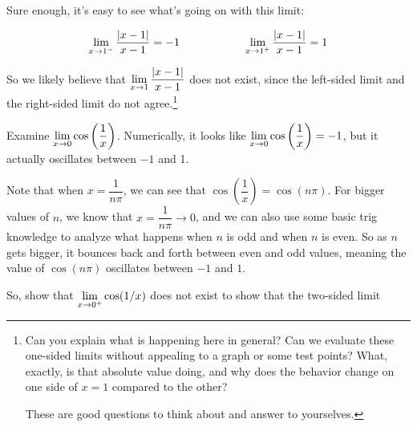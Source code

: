 \begin{enumerate}
  Sure enough, it's easy to see what's going on with this limit:

  $$\displaystyle \lim_{x\to1^-} \dfrac{|x-1|}{x-1} = -1 \hspace{2cm}\displaystyle \lim_{x\to1^+} \dfrac{|x-1|}{x-1} = 1$$

  So we likely believe that $\displaystyle \lim_{x\to1} \dfrac{|x-1|}{x-1}$ does not exist, since the left-sided limit and the right-sided limit do not agree.\footnote{Can you explain what is happening here in general?
  Can we evaluate these one-sided limits without appealing to a graph or some test points?
  What, exactly, is that absolute value doing, and why does the behavior change on one side of $x=1$ compared to the other?

  These are good questions to think about and answer to yourselves.}
\end{enumerate}

Examine $\displaystyle \lim_{x\to 0} \cos\left(\dfrac{1}{x}\right)$.
Numerically, it looks like $\displaystyle \lim_{x\to 0} \cos\left(\dfrac{1}{x}\right)=-1$, but it actually oscillates between $-1$ and 1.

Note that when $x=\dfrac{1}{n\pi}$, we can see that  $\cos\left(\dfrac{1}{x}\right)=\cos(n\pi)$.
For bigger values of $n$, we know that $x=\dfrac{1}{n\pi} \to 0$, and we can also use some basic trig knowledge to analyze what happens when $n$ is odd and when $n$ is even.
So as $n$ gets bigger, it bounces back and forth between even and odd values, meaning the value of $\cos(n\pi)$ oscillates between $-1$ and $1$.

So, show that $\displaystyle \lim_{x\to0^+}\cos(1/x)$ does not exist to show that the two-sided limit
